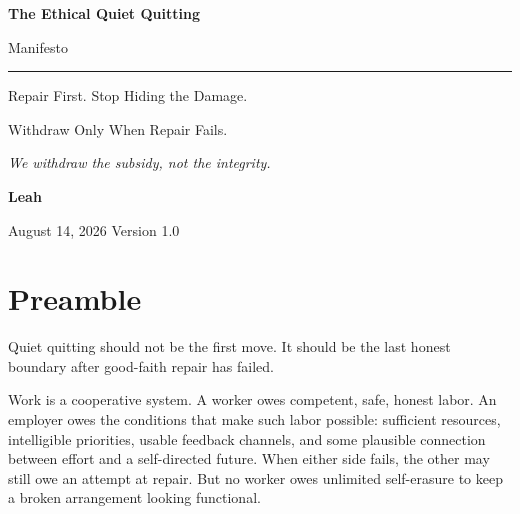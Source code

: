\documentclass[11pt,oneside]{article}
\begin{document}
\begin{titlepage}
\thispagestyle{empty}
\vspace*{0.9in}

{\sffamily\bfseries\fontsize{31}{36}\selectfont\color{ManifestInk}
The Ethical Quiet Quitting\par
Manifesto\par}

\vspace{0.5em}
{\color{ManifestRule}\rule{\textwidth}{1.2pt}}
\vspace{1.0em}

{\sffamily\fontsize{17}{23}\selectfont\color{ManifestGray}
Repair First. Stop Hiding the Damage.\par
Withdraw Only When Repair Fails.\par}

\vfill

\begin{tcolorbox}[
  enhanced,
  colback=ManifestLight,
  colframe=ManifestRule,
  boxrule=0pt,
  leftrule=4pt,
  arc=0pt,
  left=14pt,right=14pt,top=13pt,bottom=13pt
]
{\Large\itshape We withdraw the subsidy, not the integrity.}
\end{tcolorbox}

\vfill

{\sffamily\large\bfseries Leah\par}
\vspace{0.2em}
{\sffamily\color{ManifestGray}August 14, 2026 \quad Version 1.0\par}
\vspace{0.55in}
\end{titlepage}

\thispagestyle{plain}
\tableofcontents
\clearpage
{}

\section{Preamble}\label{preamble}

Quiet quitting should not be the first move. It should be the last honest boundary after good-faith repair has failed.

Work is a cooperative system. A worker owes competent, safe, honest labor. An employer owes the conditions that make such labor possible: sufficient resources, intelligible priorities, usable feedback channels, and some plausible connection between effort and a self-directed future. When either side fails, the other may still owe an attempt at repair. But no worker owes unlimited self-erasure to keep a broken arrangement looking functional.
\end{document}

